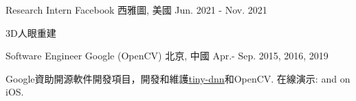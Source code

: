 


\begin{cventries}

\cventry
{Research Intern} %
{Facebook} %
{西雅圖, 美國} %
{Jun. 2021 - Nov. 2021} %
{ %
\begin{cvitems}
\item {3D人眼重建}
\end{cvitems}
}

\cventry
{Software Engineer} %
{Google (OpenCV)} %
{北京, 中國} %
{Apr.- Sep. 2015, 2016, 2019} %
{ %
\begin{cvitems}
\item {Google資助開源軟件開發項目，開發和維護\href{https://github.com/tiny-dnn/tiny-dnn}{tiny-dnn}和OpenCV. 在線演示: \href{https://www.youtube.com/watch?v=Mc20rTYdXTE}{} and \href{https://drive.google.com/open?id=0B-RYa1FDOrYXVUEzcG1mdnl5a3M}{} on iOS.
}
\end{cvitems}
}


\end{cventries}
